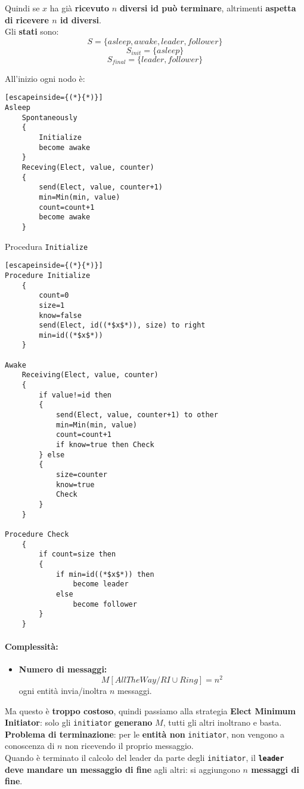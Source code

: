 Quindi se $x$ ha già \textbf{ricevuto} $n$ \textbf{diversi id può terminare}, altrimenti \textbf{aspetta di ricevere $n$ id diversi}.\\

Gli \textbf{stati} sono:
$$ S = \{asleep, awake, leader, follower\}$$
$$ S_{init} = \{asleep\} $$
$$ S_{final} = \{leader, follower\}$$

All'inizio ogni nodo è:
\begin{lstlisting}[escapeinside={(*}{*)}]
Asleep
	Spontaneously
	{
		Initialize 
		become awake
	}
	Receving(Elect, value, counter)
	{
		send(Elect, value, counter+1)
		min=Min(min, value)
		count=count+1
		become awake
	}
\end{lstlisting}

\newpage

Procedura \texttt{Initialize}
\begin{lstlisting}[escapeinside={(*}{*)}]
Procedure Initialize
	{
		count=0
		size=1
		know=false
		send(Elect, id((*$x$*)), size) to right
		min=id((*$x$*))
	}
	
Awake
	Receiving(Elect, value, counter)
	{
		if value!=id then
		{
			send(Elect, value, counter+1) to other
			min=Min(min, value)
			count=count+1
			if know=true then Check
		} else
		{
			size=counter
			know=true
			Check
		}
	}
	
Procedure Check
	{
		if count=size then
		{
			if min=id((*$x$*)) then 
				become leader
			else
				become follower
		}
	}
\end{lstlisting}

\newpage

\paragraph{Complessità: }
\begin{itemize}
	\item \textbf{Numero di messaggi:} 
	$$ M[AllTheWay/RI \cup Ring] = n^2$$
	ogni entità invia/inoltra $n$ messaggi.\\
\end{itemize}

Ma questo è \textbf{troppo costoso}, quindi passiamo alla strategia \textbf{Elect Minimum Initiator}: solo gli \texttt{initiator} \textbf{generano} $M$, tutti gli altri inoltrano e basta.\\

\textbf{Problema di terminazione}: per le \textbf{entità non} \texttt{initiator}, non vengono a conoscenza di $n$ non ricevendo il proprio messaggio. \\
Quando è terminato il calcolo del leader da parte degli \texttt{initiator}, il \textbf{\texttt{leader} deve mandare un messaggio di fine} agli altri: si aggiungono \textbf{$n$ messaggi di fine}.\\

